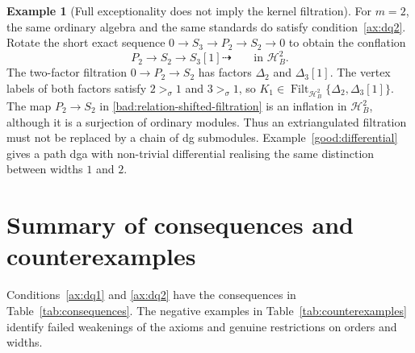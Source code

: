 \documentclass[11pt,a4paper]{article}
\renewcommand{\H}{\mathcal H}
\newcommand{\std}{\Delta}
\DeclareMathOperator{\Filt}{Filt}
\theoremstyle{plain}
\theoremstyle{definition}
\newtheorem{example}[theorem]{Example}
\numberwithin{equation}{section}
\begin{document}
\begin{example}[Full exceptionality does not imply the kernel filtration]
For $m=2$, the same ordinary algebra and the same standards do
satisfy condition~\ref{ax:dq2}. Rotate the short exact sequence
$0\to S_3\to P_2\to S_2\to0$ to obtain the conflation
\begin{equation}\label{bad:relation-shifted-filtration}
 P_2\longrightarrow S_2\longrightarrow S_3[1]\dashrightarrow
 \qquad\text{in }\H_B^2.
\end{equation}
The two-factor filtration
$0\to P_2\to S_2$ has factors $\std_2$ and $\std_3[1]$.
The vertex labels of both factors satisfy $2>_\sigma1$ and
$3>_\sigma1$, so
$K_1\in\Filt_{\H_B^2}\{\std_2,\std_3[1]\}$.
The map $P_2\to S_2$ in \eqref{bad:relation-shifted-filtration}
is an inflation in $\H_B^2$, although it is a surjection of
ordinary modules. Thus an extriangulated filtration must not be
replaced by a chain of dg submodules.
Example~\ref{good:differential} gives a path dga with non-trivial
differential realising the same distinction between widths $1$ and $2$.
\end{example}

\section{Summary of consequences and counterexamples}\label{sec:summary}

Conditions~\ref{ax:dq1} and \ref{ax:dq2} have the consequences in
Table~\ref{tab:consequences}. The negative examples in
Table~\ref{tab:counterexamples} identify failed weakenings of the
axioms and genuine restrictions on orders and widths.
\end{document}
